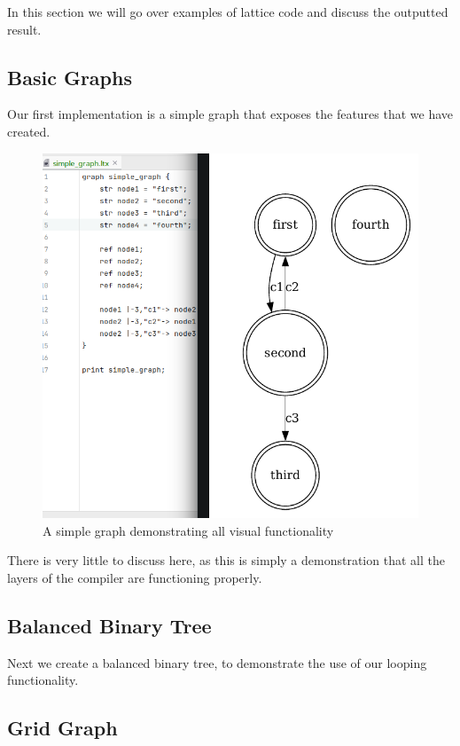 In this section we will go over examples of lattice code and discuss the outputted result.

\subsection{Basic Graphs}
Our first implementation is a simple graph that exposes the features that we have created.

\begin{figure}[H]
    \centering
    \includegraphics[width=12cm]{figures/worked_example_graphs/simple-graph}
    \caption{A simple graph demonstrating all visual functionality}
    \label{fig:basic_graph_visualisation}
\end{figure}

There is very little to discuss here, as this is simply a demonstration that all the layers of the compiler are
functioning properly.

\subsection{Balanced Binary Tree}
Next we create a balanced binary tree, to demonstrate the use of our looping functionality.

\subsection{Grid Graph}
